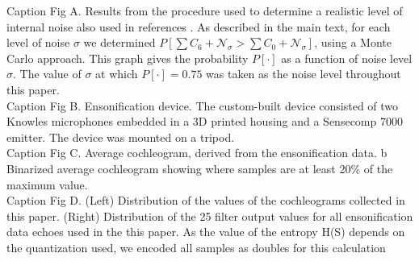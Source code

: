\documentclass[10pt,letterpaper]{article}
\begin{document}
Caption Fig A. Results from the procedure used to determine a realistic level of internal noise also used in references \cite{Dau1996,Vanderelst2016,Wiegrebe2008}. As described in the main text, for each level of noise $\sigma$ we determined $P \left [ \sum C_{6} + \mathcal{N}_{\sigma} > \sum C_{0} + \mathcal{N}_{\sigma} \right ]$, using a Monte Carlo approach. This graph gives the probability $P[\cdot]$ as a function of noise level $\sigma$. The value of $\sigma$ at which $P[\cdot] = 0.75$ was taken as the noise level throughout this paper.\\
\vspace{10pt}
Caption Fig B. Ensonification device. The custom-built device consisted of two Knowles
microphones embedded in a 3D printed housing and a Sensecomp 7000 emitter. The
device was mounted on a tripod.\\
\vspace{10pt}
Caption Fig C. Average cochleogram, derived from the ensonification data. b Binarized
average cochleogram showing where samples are at least 20\% of the maximum value.\\
\vspace{10pt}
Caption Fig D. (Left) Distribution of the values of the cochleograms collected in this paper.
(Right) Distribution of the 25 filter output values for all ensonification data echoes used
in the this paper. As the value of the entropy H(S) depends on the quantization used,
we encoded all samples as doubles for this calculation
\end{document}

